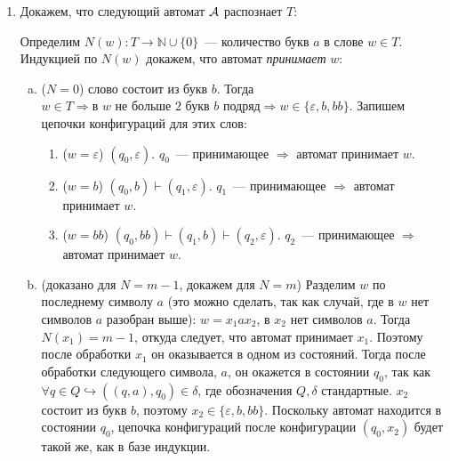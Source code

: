 \documentclass[a4paper]{article}
\begin{document}
\begin{enumerate}[1.]
\begin{enumerate}[1.]
\begin{enumerate}[a.]
\end{enumerate}
\end{enumerate}
\item Докажем, что следующий автомат ${\cal A}$ распознает $T$:
\newline
{}
\newline
Определим $N(w):T\longrightarrow {\mathbb N} \cup \{0\}$~--- количество букв $a$ в слове $w\in T$. Индукцией по $N(w)$ докажем, что автомат \emph{принимает} $w$:
\begin{enumerate}[a.]
\item ($N=0$) слово состоит из букв $b$. Тогда $w\in T\Rightarrow\text{в }w\text{ не больше }2\text{ букв }b\text{ подряд}\Rightarrow w\in\{\varepsilon,b,bb\}$. Запишем цепочки конфигураций для этих слов:
\begin{enumerate}[1.]
\item ($w=\varepsilon$) $(q_0,\varepsilon)$. $q_0$~--- принимающее $\Rightarrow$ автомат принимает $w$.
\item ($w=b$) $(q_0,b)\vdash(q_1,\varepsilon)$. $q_1$~--- принимающее $\Rightarrow$ автомат принимает $w$.
\item ($w=bb$) $(q_0,bb)\vdash(q_1,b)\vdash(q_2,\varepsilon)$. $q_2$~--- принимающее $\Rightarrow$ автомат принимает $w$.
\end{enumerate}
\item (доказано для $N=m-1$, докажем для $N=m$) Разделим $w$ по последнему символу $a$ (это можно сделать, так как случай, где в $w$ нет символов $a$ разобран выше): $w=x_1ax_2$, в $x_2$ нет символов $a$. Тогда $N(x_1)=m-1$, откуда следует, что автомат принимает $x_1$. Поэтому после обработки $x_1$ он оказывается в одном из состояний. Тогда после обработки следующего символа, $a$, он окажется в состоянии $q_0$, так как $\forall q\in Q\hookrightarrow ((q,a),q_0)\in \delta$, где обозначения $Q,\delta$ стандартные.\newline
$x_2$ состоит из букв $b$, поэтому $x_2\in \{\varepsilon,b,bb\}$. Поскольку автомат находится в состоянии $q_0$, цепочка конфигураций после конфигурации $(q_0,x_2)$ будет такой же, как в базе индукции.

\end{enumerate}
\end{enumerate}
\end{document}
